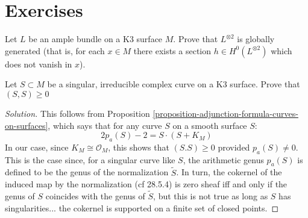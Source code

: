 \section{Exercises}
\label{section-exercises}

\begin{exercise}
\label{exercise-square-of-ample-bundle-on-K3-is-globally-generated}
Let $L$ be an ample bundle on a K3 surface $M$. Prove that $L^{\otimes 2}$ is
globally generated (that is, for each $x\in M$ there exists a section $h\in
H^{0}(L^{\otimes2})$ which does not vanish in $x$).
\end{exercise}


\begin{exercise}
\label{exercise-singular-irreducible-curve-on-K3-non-negative-self-intersection}
Let $S \subset M$ be a singular, irreducible complex curve on a K3 surface.
Prove that $(S,S)\geq 0$
\end{exercise}

\begin{proof}[Solution]
This follows from Proposition 
\ref{proposition-adjunction-formula-curves-on-surfaces}, which says that
for any curve $S$ on a smooth surface $S$:
$$
2p_a(S)-2=S\cdot (S+K_M)
$$
In our case, since $K_M \cong\mathcal{O}_M$, this shows that $(S.S)\geq 0$
provided $p_a(S) \neq 0$. This is the case since, for a singular curve like $S$,
the arithmetic genus $p_a(S)$ is defined to be the genus of the normalization
 $\tilde{S}$. In turn, the cokernel of the induced map by the normalization
(cf \cite{sea} 28.5.4) is zero sheaf iff and only if the genus of $S$ coincides
with the genus of $\tilde{S}$, but this is not true as long as $S$ has
singularities... the cokernel is supported on a finite set of closed points.
\end{proof}
